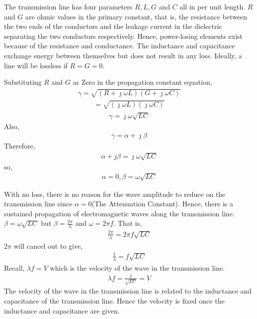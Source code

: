 The transmission line has four parameters $R, L, G$ and $C$ all in per unit length. $R$ and $G$ are ohmic values in the primary constant, that is, the resistance between the two ends of the conductors and the leakage current in the dielectric separating the two conductors respectively. Hence, power-losing elements exist because of the resistance and conductance. The inductance and capacitance exchange energy between themselves but does not result in any loss. Ideally, a line will be lossless if $R = G = 0$.

Substituting $R$ and $G$ as Zero in the propagation constant equation,
\begin{align*}
\gamma = \sqrt{(R + \jmath\omega L)(G + \jmath\omega C)}
\end{align*}
\begin{align*}
= \sqrt{(\jmath\omega L)(\jmath\omega C)}
\end{align*}
\begin{align*}
\gamma = \jmath\omega\sqrt{LC}
\end{align*}
Also,
\begin{align*}
\gamma = \alpha + \jmath\beta
\end{align*} 
Therefore,
\begin{align*}
\alpha + j\beta = \jmath\omega\sqrt{LC}
\end{align*}
so,
\begin{align*}
\alpha = 0, \beta = \omega\sqrt{LC}
\end{align*}

With no loss, there is no reason for the wave amplitude to reduce on the transmission line since $\alpha = 0$(The Attenuation Constant). Hence, there is a sustained propagation of electromagnetic waves along the transmission line.\\
$\beta = \omega\sqrt{LC}$ but $\beta = \frac{2\pi}{\lambda}$ and $\omega = 2\pi f $. That is,
\begin{align*}
\frac{2\pi}{\lambda} = 2\pi f\sqrt{LC}
\end{align*}
$2\pi$ will cancel out to give,
\begin{align*}
\frac{1}{\lambda} =  f\sqrt{LC}
\end{align*}
Recall, $\lambda f = V$ which is the velocity of the wave in the transmission line.
\begin{align*}
\lambda f = \frac{1}{\sqrt{LC}} = V
\end{align*}
The velocity of the wave in the transmission line is related to the inductance and capacitance of the transmission line. Hence the velocity is fixed once the inductance and capacitance are given.


